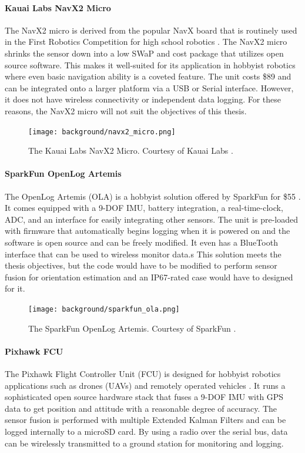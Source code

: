 \paragraph*{Kauai Labs NavX2 Micro} The NavX2 micro is derived from the popular NavX board that is routinely used in the First Robotics Competition for high school robotics \cite{KauaiLabs}.
The NavX2 micro shrinks the sensor down into a low SWaP and cost package that utilizes open source software.
This makes it well-suited for its application in hobbyist robotics where even basic navigation ability is a coveted feature.
The unit costs \$89 and can be integrated onto a larger platform via a USB or Serial interface.
However, it does not have wireless connectivity or independent data logging.
For these reasons, the NavX2 micro will not suit the objectives of this thesis.

\begin{figure}
    \centering
    \caption[Kauai Labs NavX2 Micro]{The Kauai Labs NavX2 Micro.
    Courtesy of Kauai Labs \cite{KauaiLabs}.}
    \texttt{[image: background/navx2\_micro.png]}
\end{figure}

\paragraph*{SparkFun OpenLog Artemis} The OpenLog Artemis (OLA) is a hobbyist solution offered by SparkFun for \$55 \cite{SparkFun}.
It comes equipped with a 9-DOF IMU, battery integration, a real-time-clock, ADC, and an interface for easily integrating other sensors.
The unit is pre-loaded with firmware that automatically begins logging when it is powered on and the software is open source and can be freely modified.
It even has a BlueTooth interface that can be used to wireless monitor data.s
This solution meets the thesis objectives, but the code would have to be modified to perform sensor fusion for orientation estimation and an IP67-rated case would have to designed for it.

\begin{figure}
    \centering
    \caption[SparkFun OpenLog Artemis]{The SparkFun OpenLog Artemis.
    Courtesy of SparkFun \cite{SparkFun}.}
    \texttt{[image: background/sparkfun\_ola.png]}
\end{figure}

\paragraph*{Pixhawk FCU} The Pixhawk Flight Controller Unit (FCU) is designed for hobbyist robotics applications such as drones (UAVs) and remotely operated vehicles \cite{HolyBro}.
It runs a sophisticated open source hardware stack that fuses a 9-DOF IMU with GPS data to get position and attitude with a reasonable degree of accuracy.
The sensor fusion is performed with multiple Extended Kalman Filters and can be logged internally to a microSD card.
By using a radio over the serial bus, data can be wirelessly transmitted to a ground station for monitoring and logging.

